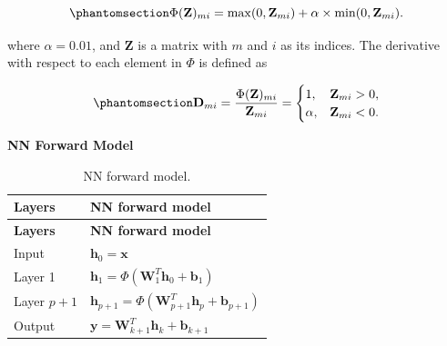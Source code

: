 \documentclass[
  11pt,
  letterpaper,
  DIV=11,
  numbers=noendperiod]{scrreprt}
\begin{document}
\begin{equation}\phantomsection\label{eq-leakyrelu}{
\Phi(\mathbf{Z})_{mi}
=
\max(0,\mathbf{Z}_{mi})
+
\alpha \times \min(0,\mathbf{Z}_{mi}).
}\end{equation}

where \(\alpha=0.01\), and \(\mathbf{Z}\) is a matrix with \(m\) and
\(i\) as its indices. The derivative with respect to each element in
\(\Phi\) is defined as

\begin{equation}\phantomsection\label{eq-D}{
\mathbf{D}_{mi}
=
\frac{\Phi(\mathbf{Z})_{mi}}
{\mathbf{Z}_{mi}}
=
\begin{cases}
1, & \mathbf{Z}_{mi}>0, \\
\alpha, & \mathbf{Z}_{mi}<0.
\end{cases}
}\end{equation}

\textbf{NN Forward Model}

\begin{longtable}[]{@{}
  >{\raggedright\arraybackslash}p{}
  >{\raggedright\arraybackslash}p{}@{}}
\caption{NN forward model.}\label{tbl-nn-forward}\tabularnewline
\toprule\noalign{}
\begin{minipage}[b]{\linewidth}\raggedright
\textbf{Layers}
\end{minipage} & \begin{minipage}[b]{\linewidth}\raggedright
\textbf{NN forward model}
\end{minipage} \\
\midrule\noalign{}
\endfirsthead
\toprule\noalign{}
\begin{minipage}[b]{\linewidth}\raggedright
\textbf{Layers}
\end{minipage} & \begin{minipage}[b]{\linewidth}\raggedright
\textbf{NN forward model}
\end{minipage} \\
\midrule\noalign{}
\endhead
\bottomrule\noalign{}
\endlastfoot
Input & \(\mathbf{h}_0=\mathbf{x}\) \\
Layer 1 &
\(\mathbf{h}_1=\Phi(\mathbf{W}_1^T\mathbf{h}_0+\mathbf{b}_1)\) \\
Layer \(p+1\) &
\(\mathbf{h}_{p+1}=\Phi(\mathbf{W}_{p+1}^T\mathbf{h}_p+\mathbf{b}_{p+1})\) \\
Output &
\(\mathbf{y}=\mathbf{W}_{k+1}^T\mathbf{h}_k+\mathbf{b}_{k+1}\) \\
\end{longtable}
\end{document}
